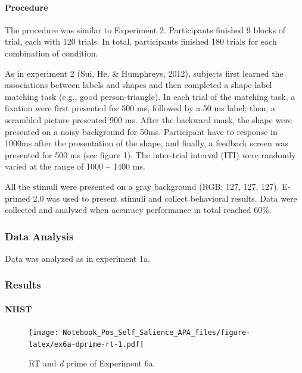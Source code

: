 \documentclass[
  english,
  man]{apa6}
\let\oldparagraph\paragraph
\renewcommand{\paragraph}[1]{\oldparagraph{#1}\mbox{}}
\begin{document}
\hypertarget{procedure-4}{%
\paragraph{Procedure}\label{procedure-4}}

The procedure was similar to Experiment 2. Participants finished 9 blocks of trial, each with 120 trials. In total, participants finished 180 trials for each combination of condition.

As in experiment 2 (Sui, He, \& Humphreys, 2012), subjects first learned the associations between labels and shapes and then completed a shape-label matching task (e.g., good person-triangle). In each trial of the matching task, a fixation were first presented for 500 ms, followed by a 50 ms label; then, a scrambled picture presented 900 ms. After the backward mask, the shape were presented on a noisy background for 50ms. Participant have to response in 1000ms after the presentation of the shape, and finally, a feedback screen was presented for 500 ms (see figure 1). The inter-trial interval (ITI) were randomly varied at the range of 1000 \textasciitilde{} 1400 ms.

All the stimuli were presented on a gray background (RGB: 127, 127, 127). E-primed 2.0 was used to present stimuli and collect behavioral results. Data were collected and analyzed when accuracy performance in total reached 60\%.

\hypertarget{data-analysis-5}{%
\subsubsection{Data Analysis}\label{data-analysis-5}}

Data was analyzed as in experiment 1a.

\hypertarget{results-4}{%
\subsubsection{Results}\label{results-4}}

\hypertarget{nhst-2}{%
\paragraph{NHST}\label{nhst-2}}

\begin{figure}
\centering
\texttt{[image: Notebook\_Pos\_Self\_Salience\_APA\_files/figure-latex/ex6a-dprime-rt-1.pdf]}
\caption{\label{fig:ex6a-dprime-rt}RT and \emph{d} prime of Experiment 6a.}
\end{figure}
\end{document}
